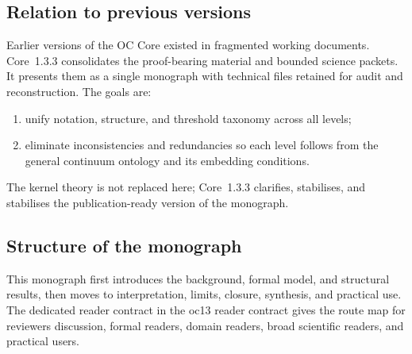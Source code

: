\subsection{Relation to previous versions}

Earlier versions of the OC Core existed in fragmented working documents.
Core~1.3.3 consolidates the proof-bearing material and bounded science packets.
It presents them as a single monograph with technical files retained for audit and
reconstruction. The goals are:

\begin{enumerate}
    \item unify notation, structure, and threshold taxonomy across all levels;
    \item eliminate inconsistencies and redundancies so each level follows from the general continuum ontology and its embedding conditions.
\end{enumerate}

The kernel theory is not replaced here; Core~1.3.3 clarifies, stabilises, and
stabilises the publication-ready version of the monograph.

\subsection{Structure of the monograph}

This monograph first introduces the background, formal model, and structural
results, then moves to interpretation, limits, closure, synthesis, and
practical use. The dedicated reader contract in
the oc13 reader contract gives the route map for reviewers discussion,
formal readers, domain readers, broad scientific readers, and practical
users.

